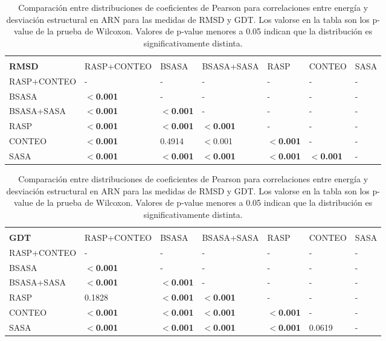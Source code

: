 \begin{table}[!htp]
\begin{tabular}{p{78pt} p{78pt} p{35pt} p{70pt} p{29pt} p{40pt} p{20pt}}
\hline \\
\textbf{RMSD}& RASP+CONTEO & BSASA    & BSASA+SASA &  RASP    & CONTEO   & SASA \\
RASP+CONTEO  & -           & -        & -          & -        & -        & -    \\
BSASA        & \textbf{$<$0.001}    & -        & -          & -        & -        & -    \\
BSASA+SASA   & \textbf{$<$0.001}    & \textbf{$<$0.001} & -          & -        & -        & -    \\
RASP         & \textbf{$<$0.001}    & \textbf{$<$0.001} & \textbf{$<$0.001}   & -        & -        & -    \\
CONTEO       & \textbf{$<$0.001}    & 0.4914   & $<$0.001   & \textbf{$<$0.001} & -        & -    \\
SASA         & \textbf{$<$0.001}    & \textbf{$<$0.001} & \textbf{$<$0.001}   & \textbf{$<$0.001} & \textbf{$<$0.001} & -    \\
\hline
\end{tabular}
\begin{tabular}{p{78pt} p{78pt} p{35pt} p{70pt} p{29pt} p{40pt} p{20pt}}
\hline \\
\textbf{GDT} & RASP+CONTEO & BSASA    & BSASA+SASA & RASP     & CONTEO   & SASA \\
RASP+CONTEO  & -           & -        & -          & -        & -        & -    \\
BSASA        & \textbf{$<$0.001}    & -        & -          & -        & -        & -    \\
BSASA+SASA   & \textbf{$<$0.001}    & \textbf{$<$0.001} & -          & -        & -        & -    \\
RASP         & 0.1828      & \textbf{$<$0.001} & \textbf{$<$0.001}   & -        & -        & -    \\
CONTEO       & \textbf{$<$0.001}    & \textbf{$<$0.001} & \textbf{$<$0.001}   & \textbf{$<$0.001} & -        & -    \\
SASA         & \textbf{$<$0.001}    & \textbf{$<$0.001} & \textbf{$<$0.001}   & \textbf{$<$0.001} & 0.0619   & -    \\
\hline
\end{tabular}
\caption[Comparación entre distribuciones de coeficientes de Pearson para correlaciones entre energía y desviación estructural en ARN.]{Comparación entre distribuciones de coeficientes de Pearson para correlaciones entre energía y desviación estructural en ARN para las medidas de RMSD y GDT. Los valorse en la tabla son los p-value de la prueba de Wilcoxon. Valores de p-value menores a 0.05 indican que la distribución es significativamente distinta.}
\label{table:cap2011res}
\end{table}

